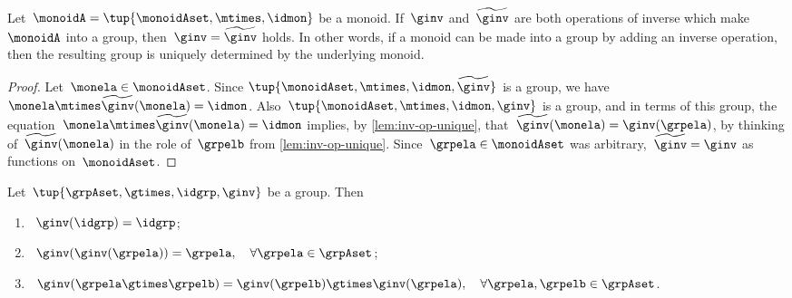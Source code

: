 \begin{corollary}
    \label{cor:inv-op-unique}
    Let~$\monoidA = \tup{\monoidAset, \mtimes,  \idmon }$ be a monoid.
    If~$\ginv$ and~$\widetilde \ginv$ are both operations of inverse which make~$\monoidA$ into a group, then~$\ginv = \widetilde \ginv$ holds.
    In other words, if a monoid can be made into a group by adding an inverse operation, then the resulting group is uniquely determined by the underlying monoid.
\end{corollary}

\begin{proof}
    Let~$\monela \in \monoidAset$.
    Since $\tup{\monoidAset, \mtimes,  \idmon, \widetilde \ginv }$ is a group, we have~$\monela \mtimes  \widetilde \ginv(\monela) = \idmon$.
    Also~$\tup{\monoidAset, \mtimes,  \idmon, \ginv }$ is a group, and in terms of this group, the equation~$\monela \mtimes  \widetilde \ginv(\monela) = \idmon$ implies, by \cref{lem:inv-op-unique}, that~$\widetilde \ginv(\monela) = \ginv(\grpela)$, by thinking of~$\widetilde \ginv(\monela)$ in the role of~$\grpelb$ from \cref{lem:inv-op-unique}.
    Since~$\grpela \in \monoidAset$ was arbitrary,~$\widetilde \ginv = \ginv$ as functions on~$\monoidAset$.
\end{proof}

\begin{lemma}
    \label{lem:inv-op-properties}
    Let~$\tup{\grpAset, \gtimes, \idgrp, \ginv}$ be a group.
    Then
    \begin{enumerate}
        \item\label{eq:group-neutral-invariant}~$\ginv(\idgrp) = \idgrp$;
        \item\label{eq:group-inverse-inverse}~$ \ginv(\ginv(\grpela)) = \grpela, \quad \forall \grpela \in \grpAset$;
        \item\label{eq:group-inverse-of-composition}~$\ginv(\grpela \gtimes \grpelb ) = \ginv(\grpelb) \gtimes \ginv(\grpela), \quad \forall \grpela, \grpelb \in \grpAset$.
    \end{enumerate}
\end{lemma}

